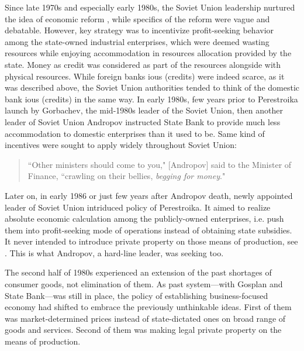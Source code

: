 Since late 1970s and especially early 1980s, the Soviet Union leadership
nurtured the idea of economic reform \citep{zubok2021}, while specifics of
the reform were vague and debatable. However, key strategy was to
incentivize profit-seeking behavior among the state-owned industrial
enterprises, which were deemed wasting resources while enjoying
accommodation in resources allocation provided by the state. Money as
credit was considered as part of the resources alongside with physical
resources. While foreign banks \acp{iou} (credits) were indeed scarce, as it
was described above, the Soviet Union authorities tended to think of the
domestic bank \acp{iou} (credits) in the same way. In early 1980s, few years
prior to Perestroika launch by Gorbachev, the mid-1980s leader of the
Soviet Union, then another leader of Soviet Union Andropov instructed
State Bank to provide much less accommodation to domestic enterprises
than it used to be. Same kind of incentives were
sought to apply widely throughout Soviet Union:

\begin{quote}
 ``Other ministers should come to you," [Andropov] said to the Minister
 of Finance, ``crawling on their bellies, \textit{begging for money}."~\citep[p.~18, emphasis added]{zubok2021}
\end{quote}

Later on, in early 1986 or just few years after Andropov death, newly
appointed leader of Soviet Union intriduced policy of Perestroika. It
aimed to realize absolute economic calculation among the publicly-owned
enterprises, i.e. push them into profit-seeking mode of operations
instead of obtaining state subsidies. It never intended to introduce
private property on those means of production, see \citep{gorb}. This is what
Andropov, a hard-line leader, was seeking too.

The second half of 1980s experienced an extension of the past shortages
of consumer goods, not elimination of them. As past system---with
Gosplan and State Bank---was still in place, the policy of establishing
business-focused economy had shifted to embrace the previously
unthinkable ideas. First of them was market-determined prices instead of
state-dictated ones on broad range of goods and services. Second of them
was making legal private property on the means of production.

